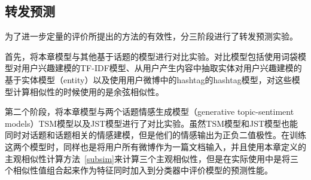 \subsection{转发预测}
为了进一步定量的评价所提出的方法的有效性，分三阶段进行了转发预测实验。

首先，将本章模型与其他基于话题的模型进行对比实验。对比模型包括使用词袋模型对用户兴趣建模的TF-IDF模型、从用户产生内容中抽取实体对用户兴趣建模的基于实体模型（entity）以及使用用户微博中的hashtag的hashtag模型，对这些模型计算相似性的时候使用的是余弦相似性。

第二个阶段，将本章模型与两个话题情感生成模型（generative topic-sentiment models）TSM模型以及JST模型进行了对比实验。虽然TSM模型和JST模型也能同时对话题和话题相关的情感建模，但是他们的情感输出为正负二值极性。在训练这两个模型时，同样也是将用户所有微博作为一篇文档输入，并且使用本章定义的主观相似性计算方法~\ref{subsim}来计算三个主观相似性，但是在实际使用中是将三个相似性值组合起来作为特征同时加入到分类器中评价模型的预测性能。

